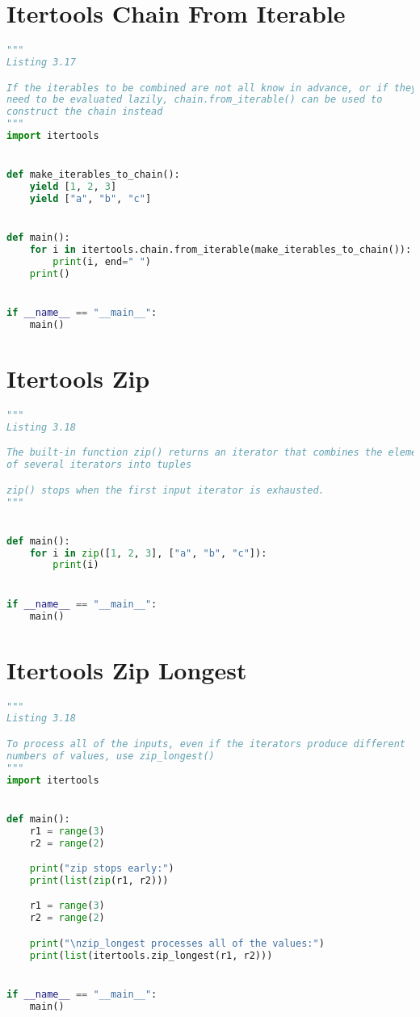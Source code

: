 \documentclass[a4paper,landscape]{report}
\begin{document}
\section{Itertools Chain From Iterable}
\begin{lstlisting}[language=Python]
"""
Listing 3.17

If the iterables to be combined are not all know in advance, or if they
need to be evaluated lazily, chain.from_iterable() can be used to
construct the chain instead
"""
import itertools


def make_iterables_to_chain():
    yield [1, 2, 3]
    yield ["a", "b", "c"]


def main():
    for i in itertools.chain.from_iterable(make_iterables_to_chain()):
        print(i, end=" ")
    print()


if __name__ == "__main__":
    main()

\end{lstlisting}
\section{Itertools Zip}
\begin{lstlisting}[language=Python]
"""
Listing 3.18

The built-in function zip() returns an iterator that combines the elements
of several iterators into tuples

zip() stops when the first input iterator is exhausted.
"""


def main():
    for i in zip([1, 2, 3], ["a", "b", "c"]):
        print(i)


if __name__ == "__main__":
    main()

\end{lstlisting}
\section{Itertools Zip Longest}
\begin{lstlisting}[language=Python]
"""
Listing 3.18

To process all of the inputs, even if the iterators produce different
numbers of values, use zip_longest()
"""
import itertools


def main():
    r1 = range(3)
    r2 = range(2)

    print("zip stops early:")
    print(list(zip(r1, r2)))

    r1 = range(3)
    r2 = range(2)

    print("\nzip_longest processes all of the values:")
    print(list(itertools.zip_longest(r1, r2)))


if __name__ == "__main__":
    main()

\end{lstlisting}
\end{document}
